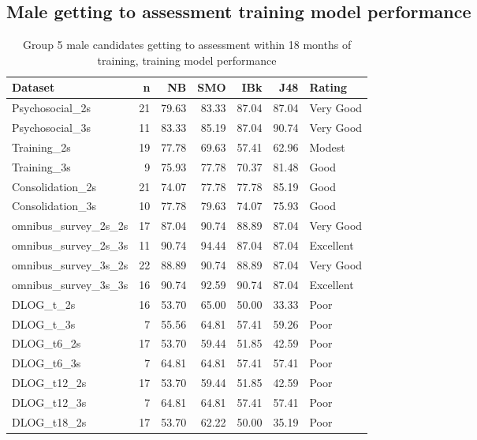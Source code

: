 \documentclass[a4paper,]{book}
\begin{document}
\hypertarget{male-getting-to-assessment-training-model-performance}{%
\subsection{Male getting to assessment training model performance}\label{male-getting-to-assessment-training-model-performance}}

\begin{table}

\caption{\label{tab:g5-male-gta18m-train-models}Group 5 male candidates getting to assessment within 18 months of training, training model performance}
\centering
\begin{tabular}[t]{lrrrrrl}
\toprule
Dataset & n & NB & SMO & IBk & J48 & Rating\\
\midrule
Psychosocial\_2s & 21 & 79.63 & 83.33 & 87.04 & 87.04 & Very Good\\
Psychosocial\_3s & 11 & 83.33 & 85.19 & 87.04 & 90.74 & Very Good\\
Training\_2s & 19 & 77.78 & 69.63 & 57.41 & 62.96 & Modest\\
Training\_3s & 9 & 75.93 & 77.78 & 70.37 & 81.48 & Good\\
Consolidation\_2s & 21 & 74.07 & 77.78 & 77.78 & 85.19 & Good\\
\addlinespace
Consolidation\_3s & 10 & 77.78 & 79.63 & 74.07 & 75.93 & Good\\
omnibus\_survey\_2s\_2s & 17 & 87.04 & 90.74 & 88.89 & 87.04 & Very Good\\
omnibus\_survey\_2s\_3s & 11 & 90.74 & 94.44 & 87.04 & 87.04 & Excellent\\
omnibus\_survey\_3s\_2s & 22 & 88.89 & 90.74 & 88.89 & 87.04 & Very Good\\
omnibus\_survey\_3s\_3s & 16 & 90.74 & 92.59 & 90.74 & 87.04 & Excellent\\
\addlinespace
DLOG\_t\_2s & 16 & 53.70 & 65.00 & 50.00 & 33.33 & Poor\\
DLOG\_t\_3s & 7 & 55.56 & 64.81 & 57.41 & 59.26 & Poor\\
DLOG\_t6\_2s & 17 & 53.70 & 59.44 & 51.85 & 42.59 & Poor\\
DLOG\_t6\_3s & 7 & 64.81 & 64.81 & 57.41 & 57.41 & Poor\\
DLOG\_t12\_2s & 17 & 53.70 & 59.44 & 51.85 & 42.59 & Poor\\
\addlinespace
DLOG\_t12\_3s & 7 & 64.81 & 64.81 & 57.41 & 57.41 & Poor\\
DLOG\_t18\_2s & 17 & 53.70 & 62.22 & 50.00 & 35.19 & Poor\\

\end{tabular}
\end{table}
\end{document}
